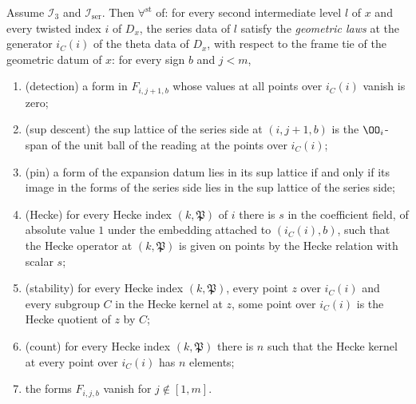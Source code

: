 \begin{proposition}\label{pf:baselat2:geolaws}
Assume $\mathcal I_3$ and $\mathcal I_{\mathrm{ser}}$. Then $\forall^{\mathrm{st}}$ of: for every second intermediate
level $l$ of $x$ and every twisted index $i$ of $D_x$, the series data of $l$ satisfy the \emph{geometric laws}
at the generator $i_C(i)$ of the theta data of $D_x$, with respect to the frame tie of the geometric datum
of $x$: for every sign $b$ and $j<m$,
\begin{enumerate}[label=(\roman*)]
\item (detection) a form in $F_{i,j+1,b}$ whose values at all points over $i_C(i)$ vanish is zero;
\item (sup descent) the sup lattice of the series side at $(i,j+1,b)$ is the $\OO_i$-span of the unit ball of
  the reading at the points over $i_C(i)$;
\item (pin) a form of the expansion datum lies in its sup lattice if and only if its image in the forms of
  the series side lies in the sup lattice of the series side;
\item (Hecke) for every Hecke index $(k,\mathfrak P)$ of $i$ there is $s$ in the coefficient field, of absolute
  value $1$ under the embedding attached to $(i_C(i),b)$, such that the Hecke operator at $(k,\mathfrak P)$ is given
  on points by the Hecke relation with scalar $s$;
\item (stability) for every Hecke index $(k,\mathfrak P)$, every point $z$ over $i_C(i)$ and every subgroup $C$ in the
  Hecke kernel at $z$, some point over $i_C(i)$ is the Hecke quotient of $z$ by $C$;
\item (count) for every Hecke index $(k,\mathfrak P)$ there is $n$ such that the Hecke kernel at every point over
  $i_C(i)$ has $n$ elements;
\item the forms $F_{i,j,b}$ vanish for $j\notin[1,m]$.
\end{enumerate}
\end{proposition}


